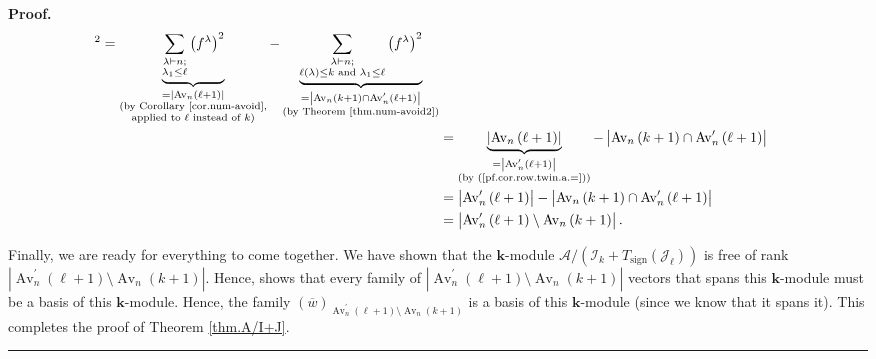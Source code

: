 \documentclass[numbers=enddot,12pt,final,onecolumn,notitlepage]{scrartcl}%
\numberwithin{exer}{subsection}
\theoremstyle{definition}
\newenvironment{proof}[1][Proof]{\noindent\textbf{#1.} }{\ \rule{0.5em}{0.5em}}
\let\sumnonlimits\sum
\renewcommand{\sum}{\sumnonlimits\limits}
\begin{document}
\begin{proof}
\begin{align*}
^{2}=\underbrace{\sum_{\substack{\lambda\vdash n;\\\lambda_{1}\leq\ell
}}\left(  f^{\lambda}\right)  ^{2}}_{\substack{=\left\vert \operatorname*{Av}%
\nolimits_{n}\left(  \ell+1\right)  \right\vert \\\text{(by Corollary
\ref{cor.num-avoid},}\\\text{applied to }\ell\text{ instead of }k\text{)}%
}}-\underbrace{\sum\limits_{\substack{\lambda\vdash n;\\\ell\left(
\lambda\right)  \leq k\text{ and }\lambda_{1}\leq\ell}}\left(  f^{\lambda
}\right)  ^{2}}_{\substack{=\left\vert \operatorname*{Av}\nolimits_{n}\left(
k+1\right)  \cap\operatorname*{Av}\nolimits_{n}^{\prime}\left(  \ell+1\right)
\right\vert \\\text{(by Theorem \ref{thm.num-avoid2})}}}\\
&  =\underbrace{\left\vert \operatorname*{Av}\nolimits_{n}\left(
\ell+1\right)  \right\vert }_{\substack{=\left\vert \operatorname*{Av}%
\nolimits_{n}^{\prime}\left(  \ell+1\right)  \right\vert \\\text{(by
(\ref{pf.cor.row.twin.a.=}))}}}-\left\vert \operatorname*{Av}\nolimits_{n}%
\left(  k+1\right)  \cap\operatorname*{Av}\nolimits_{n}^{\prime}\left(
\ell+1\right)  \right\vert \\
&  =\left\vert \operatorname*{Av}\nolimits_{n}^{\prime}\left(  \ell+1\right)
\right\vert -\left\vert \operatorname*{Av}\nolimits_{n}\left(  k+1\right)
\cap\operatorname*{Av}\nolimits_{n}^{\prime}\left(  \ell+1\right)  \right\vert
\\
&  =\left\vert \operatorname*{Av}\nolimits_{n}^{\prime}\left(  \ell+1\right)
\setminus\operatorname*{Av}\nolimits_{n}\left(  k+1\right)  \right\vert .
\end{align*}


Finally, we are ready for everything to come together. We have shown that the
$\mathbf{k}$-module $\mathcal{A}/\left(  \mathcal{I}_{k}%
+T_{\operatorname*{sign}}\left(  \mathcal{J}_{\ell}\right)  \right)  $ is free
of rank $\left\vert \operatorname*{Av}\nolimits_{n}^{\prime}\left(
\ell+1\right)  \setminus\operatorname*{Av}\nolimits_{n}\left(  k+1\right)
\right\vert $. Hence, \cite[Lemma 5.21.9]{sga} shows that every family of
$\left\vert \operatorname*{Av}\nolimits_{n}^{\prime}\left(  \ell+1\right)
\setminus\operatorname*{Av}\nolimits_{n}\left(  k+1\right)  \right\vert $
vectors that spans this $\mathbf{k}$-module must be a basis of this
$\mathbf{k}$-module. Hence, the family $\left(  \overline{w}\right)
_{\operatorname*{Av}\nolimits_{n}^{\prime}\left(  \ell+1\right)
\setminus\operatorname*{Av}\nolimits_{n}\left(  k+1\right)  }$ is a basis of
this $\mathbf{k}$-module (since we know that it spans it). This completes the
proof of Theorem \ref{thm.A/I+J}.
\end{proof}
\end{document}
